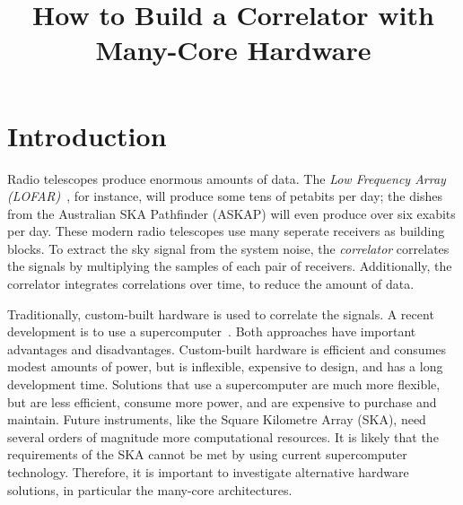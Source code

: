 \documentclass{article}
\title{How to Build a Correlator with Many-Core Hardware}
\begin{document}
\maketitle

\begin{abstract}
\end{abstract}

\section{Introduction}


Radio telescopes produce enormous amounts of data.
The \emph{Low Frequency Array
(LOFAR)\/}~\cite{Butcher:04,deVos:09}, for instance, will produce some tens of
petabits per day; the dishes from the Australian SKA Pathfinder (ASKAP) will
even produce over six exabits per day.
These modern radio telescopes use many seperate receivers as building blocks.
To extract the sky signal from the system noise, the \emph{correlator\/}
correlates the signals by multiplying the samples of each pair of receivers.
Additionally, the correlator integrates correlations over time, to reduce
the amount of data.

Traditionally, custom-built hardware is used to correlate the signals.
A recent development is to use a supercomputer~\cite{Romein:06,Romein:09b}.
Both approaches have important advantages and disadvantages.
Custom-built hardware is efficient and consumes modest amounts of power, but is
inflexible, expensive to design, and has a long development time.
Solutions that use a supercomputer are much more flexible, but are less
efficient, consume more power, and are expensive to purchase and maintain.
Future instruments, like the Square Kilometre Array (SKA), need several orders
of magnitude more computational resources.
It is likely that the requirements of the SKA cannot be met by using
current supercomputer technology. Therefore, it is important to investigate
alternative hardware solutions, in particular the many-core architectures.
\end{document}

